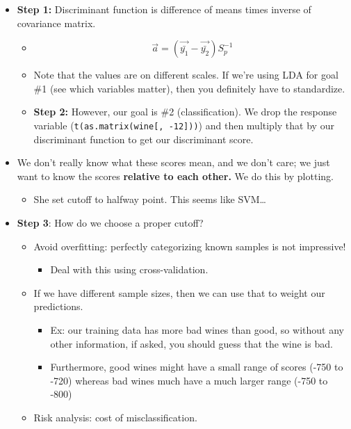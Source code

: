 \documentclass[]{article}
\providecommand{\tightlist}{%
  \setlength{\itemsep}{0pt}\setlength{\parskip}{0pt}}
\begin{document}
\begin{itemize}
\tightlist
\item
  \textbf{Step 1:} Discriminant function is difference of means times
  inverse of covariance matrix.

  \begin{itemize}
  \tightlist
  \item
    \[\vec{a} = (\vec{\bar{y_1}} - \vec{\bar{y_2}}) S_p^{-1}\]
  \item
    Note that the values are on different scales. If we're using LDA for
    goal \#1 (see which variables matter), then you definitely have to
    standardize.
  \item
    \textbf{Step 2:} However, our goal is \#2 (classification). We drop
    the response variable (\texttt{t(as.matrix(wine{[},\ -12{]}))}) and
    then multiply that by our discriminant function to get our
    discriminant score.
  \end{itemize}
\item
  We don't really know what these scores mean, and we don't care; we
  just want to know the scores \textbf{relative to each other.} We do
  this by plotting.

  \begin{itemize}
  \tightlist
  \item
    She set cutoff to halfway point. This seems like SVM\ldots{}
  \end{itemize}
\item
  \textbf{Step 3}: How do we choose a proper cutoff?

  \begin{itemize}
  \tightlist
  \item
    Avoid overfitting: perfectly categorizing known samples is not
    impressive!

    \begin{itemize}
    \tightlist
    \item
      Deal with this using cross-validation.
    \end{itemize}
  \item
    If we have different sample sizes, then we can use that to weight
    our predictions.

    \begin{itemize}
    \tightlist
    \item
      Ex: our training data has more bad wines than good, so without any
      other information, if asked, you should guess that the wine is
      bad.
    \item
      Furthermore, good wines might have a small range of scores (-750
      to -720) whereas bad wines much have a much larger range (-750 to
      -800)
    \end{itemize}
  \item
    Risk analysis: cost of misclassification.


\end{itemize}
\end{itemize}
\end{document}
